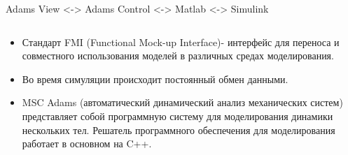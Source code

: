 \documentclass[12pt, aspectratio=169]{beamer}
\begin{document}
      \begin{frame}{Adams View <-> Adams Control <-> Matlab <-> Simulink}
        \begin{columns}[T,onlytextwidth]
                \begin{column}{0.65\textwidth}
                  \vspace{-0.5cm}
                        \begin{itemize}
                                \item \small Стандарт FMI (Functional Mock-up Interface)-
                                интерфейс для переноса и совместного использования моделей в различных средах моделирования.
                                \item \small Во время симуляции происходит постоянный обмен данными.
                                \item \small MSC Adams (автоматический динамический анализ механических систем) представляет собой программную систему
                                 для моделирования динамики нескольких тел.
                                 Решатель программного обеспечения для моделирования работает в основном на C++.  
                        \end{itemize}
                \end{column}
                \begin{column}{0.35\textwidth}
                \vspace{0.5cm}
                \end{column}
        \end{columns}
      \end{frame}

  
\end{document}
